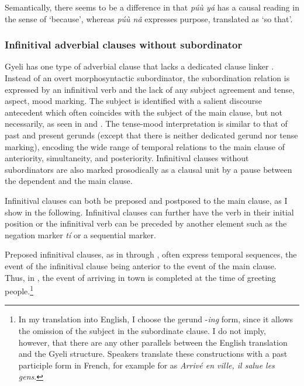 \noindent Semantically, there seems to be a difference in that {\itshape púù yá} has a causal reading in the sense of `because', whereas {\itshape púù nâ}  expresses purpose, translated as `so that'.





\subsubsection[Infinitival adverbial clauses]{Infinitival adverbial clauses without subordinator}
\label{sec:InfSub}

Gyeli has one type of adverbial clause that lacks a dedicated clause linker \citep[109]{hetterle2015}. Instead of an overt morphosyntactic subordinator, the subordination relation is expressed by an infinitival verb and the lack of any subject agreement and tense, aspect, mood marking. The subject is identified with a salient discourse antecedent which often coincides with the subject of the main clause, but not necessarily, as seen in  and . The tense-mood interpretation is similar to that of past and present gerunds (except that there is neither dedicated gerund nor tense marking), encoding the wide range of temporal relations to the main clause of anteriority, simultaneity, and posteriority.
Infinitival clauses without subordinators are also marked prosodically as a clausal unit by a pause between the dependent and the main clause.


 Infinitival clauses can both be preposed and postposed to the main clause, as I show in the following. Infinitival clauses can further have the verb in their initial position or the infinitival verb can be preceded by another element such as the negation marker {\itshape tí} or a sequential marker.

Preposed infinitival clauses, as in  through , often express temporal sequences, the event of the infinitival clause being anterior to the event of the main clause. Thus, in , the event of arriving in town is completed at the time of greeting people.\footnote{In my translation into English, I choose the gerund -{\itshape ing} form, since it allows the omission of the subject in the subordinate clause. I do not imply, however, that there are any other parallels between the English translation and the Gyeli structure. Speakers translate these constructions with a past participle form in French, for example for  as {\itshape Arrivé en ville, il salue les gens}.}



